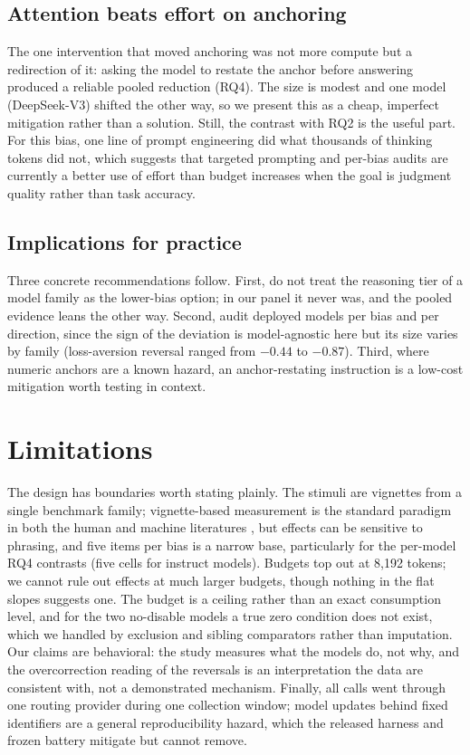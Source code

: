 \documentclass[conference]{IEEEtran}
\begin{document}
\subsection{Attention beats effort on anchoring}
The one intervention that moved anchoring was not more compute but a redirection of it: asking the model to restate the anchor before answering produced a reliable pooled reduction (RQ4). The size is modest and one model (DeepSeek-V3) shifted the other way, so we present this as a cheap, imperfect mitigation rather than a solution. Still, the contrast with RQ2 is the useful part. For this bias, one line of prompt engineering did what thousands of thinking tokens did not, which suggests that targeted prompting and per-bias audits are currently a better use of effort than budget increases when the goal is judgment quality rather than task accuracy.

\subsection{Implications for practice}
Three concrete recommendations follow. First, do not treat the reasoning tier of a model family as the lower-bias option; in our panel it never was, and the pooled evidence leans the other way. Second, audit deployed models per bias and per direction, since the sign of the deviation is model-agnostic here but its size varies by family (loss-aversion reversal ranged from $-0.44$ to $-0.87$). Third, where numeric anchors are a known hazard, an anchor-restating instruction is a low-cost mitigation worth testing in context.

\section{Limitations}

The design has boundaries worth stating plainly. The stimuli are vignettes from a single benchmark family; vignette-based measurement is the standard paradigm in both the human and machine literatures \cite{tversky1974judgment, malberg2024comprehensive}, but effects can be sensitive to phrasing, and five items per bias is a narrow base, particularly for the per-model RQ4 contrasts (five cells for instruct models). Budgets top out at 8,192 tokens; we cannot rule out effects at much larger budgets, though nothing in the flat slopes suggests one. The budget is a ceiling rather than an exact consumption level, and for the two no-disable models a true zero condition does not exist, which we handled by exclusion and sibling comparators rather than imputation. Our claims are behavioral: the study measures what the models do, not why, and the overcorrection reading of the reversals is an interpretation the data are consistent with, not a demonstrated mechanism. Finally, all calls went through one routing provider during one collection window; model updates behind fixed identifiers are a general reproducibility hazard, which the released harness and frozen battery mitigate but cannot remove.
\end{document}
